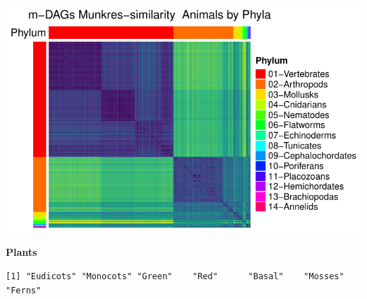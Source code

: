 \documentclass[
  letterpaper,
  DIV=11,
  numbers=noendperiod]{scrreprt}
\newenvironment{Shaded}{}{}
\newcommand{\DecValTok}[1]{\textcolor[rgb]{0.82,0.60,0.40}{#1}}
\newcommand{\FunctionTok}[1]{\textcolor[rgb]{0.38,0.69,0.94}{#1}}
\newcommand{\NormalTok}[1]{\textcolor[rgb]{0.67,0.70,0.75}{#1}}
\newcommand{\OtherTok}[1]{\textcolor[rgb]{0.15,0.68,0.38}{#1}}
\newcommand{\SpecialCharTok}[1]{\textcolor[rgb]{0.34,0.71,0.76}{#1}}
\newcommand{\StringTok}[1]{\textcolor[rgb]{0.60,0.76,0.47}{#1}}
\begin{document}
\includegraphics[width=1\textwidth,height=\textheight]{appendix_files/figure-pdf/unnamed-chunk-7-2.pdf}

\textbf{Plants}

\begin{Shaded}
\end{Shaded}

\begin{verbatim}
[1] "Eudicots" "Monocots" "Green"    "Red"      "Basal"    "Mosses"   "Ferns"   
\end{verbatim}
\end{document}

